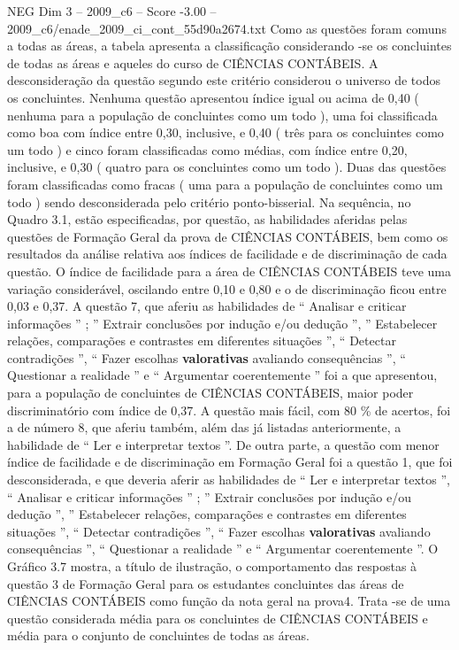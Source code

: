 \begin{textsample}{NEG Dim 3 – 2009\_c6 – Score -3.00 – 2009\_c6/enade\_2009\_ci\_cont\_55d90a2674.txt}
Como as questões foram comuns a todas as áreas, a tabela apresenta a classificação considerando -se os concluintes de todas as áreas e aqueles do curso de CIÊNCIAS CONTÁBEIS.
A desconsideração da questão segundo este critério considerou o universo de todos os concluintes.
Nenhuma questão apresentou índice igual ou acima de 0,40 ( nenhuma para a população de concluintes como um todo ), uma foi classificada como boa com índice entre 0,30, inclusive, e 0,40 ( três para os concluintes como um todo ) e cinco foram classificadas como médias, com índice entre 0,20, inclusive, e 0,30 ( quatro para os concluintes como um todo ).
Duas das questões foram classificadas como fracas ( uma para a população de concluintes como um todo ) sendo desconsiderada pelo critério ponto-bisserial.
Na sequência, no Quadro 3.1, estão especificadas, por questão, as habilidades aferidas pelas questões de Formação Geral da prova de CIÊNCIAS CONTÁBEIS, bem como os resultados da análise relativa aos índices de facilidade e de discriminação de cada questão.
O índice de facilidade para a área de CIÊNCIAS CONTÁBEIS teve uma variação considerável, oscilando entre 0,10 e 0,80 e o de discriminação ficou entre 0,03 e 0,37.
A questão 7, que aferiu as habilidades de “ Analisar e criticar informações ” ; ” Extrair conclusões por indução e/ou dedução ”, ” Estabelecer relações, comparações e contrastes em diferentes situações ”, “ Detectar contradições ”, “ Fazer escolhas \textbf{valorativas} avaliando consequências ”, “ Questionar a realidade ” e “ Argumentar coerentemente ” foi a que apresentou, para a população de concluintes de CIÊNCIAS CONTÁBEIS, maior poder discriminatório com índice de 0,37.
A questão mais fácil, com 80 \% de acertos, foi a de número 8, que aferiu também, além das já listadas anteriormente, a habilidade de “ Ler e interpretar textos ”.
De outra parte, a questão com menor índice de facilidade e de discriminação em Formação Geral foi a questão 1, que foi desconsiderada, e que deveria aferir as habilidades de “ Ler e interpretar textos ”, “ Analisar e criticar informações ” ; ” Extrair conclusões por indução e/ou dedução ”, ” Estabelecer relações, comparações e contrastes em diferentes situações ”, “ Detectar contradições ”, “ Fazer escolhas \textbf{valorativas} avaliando consequências ”, “ Questionar a realidade ” e “ Argumentar coerentemente ”.
O Gráfico 3.7 mostra, a título de ilustração, o comportamento das respostas à questão 3 de Formação Geral para os estudantes concluintes das áreas de CIÊNCIAS CONTÁBEIS como função da nota geral na prova4.
Trata -se de uma questão considerada média para os concluintes de CIÊNCIAS CONTÁBEIS e média para o conjunto de concluintes de todas as áreas.

\end{textsample}

